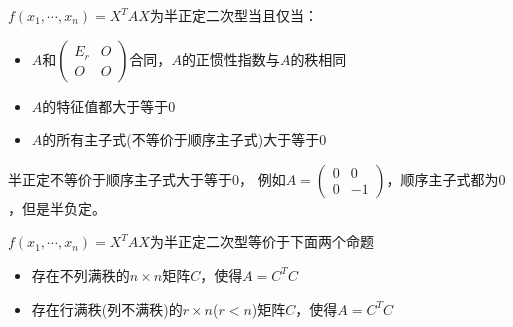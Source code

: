 \begin{theorem}[半正定二次型的基础充要条件]
  $f(x_1,\cdots,x_n) = X^T AX$为半正定二次型当且仅当：
  \begin{itemize}
  \item $A$和$\left(
      \begin{array}{cc}
        E_r&O\\
        O&O
      \end{array}
    \right)$合同，$A$的正惯性指数与$A$的秩相同
  \item $A$的特征值都大于等于$0$
  \item $A$的所有主子式(不等价于顺序主子式)大于等于$0$
  \end{itemize}
\end{theorem}

\begin{note}
  半正定不等价于顺序主子式大于等于$0$，
  例如$A = \left(
    \begin{array}{cc}
      0&0\\
      0&-1
    \end{array}
  \right)$，顺序主子式都为$0$，但是半负定。
\end{note}

\begin{theorem}[半正定矩阵的$C^TC$分解]
  $f(x_1,\cdots,x_n) = X^T AX$为半正定二次型等价于下面两个命题
  \begin{itemize}
  \item 存在不列满秩的$n \times n$矩阵$C$，使得$A = C^TC$
  \item 存在行满秩(列不满秩)的$r \times n$($r < n$)矩阵$C$，使得$A = C^TC$
  \end{itemize}
\end{theorem}

